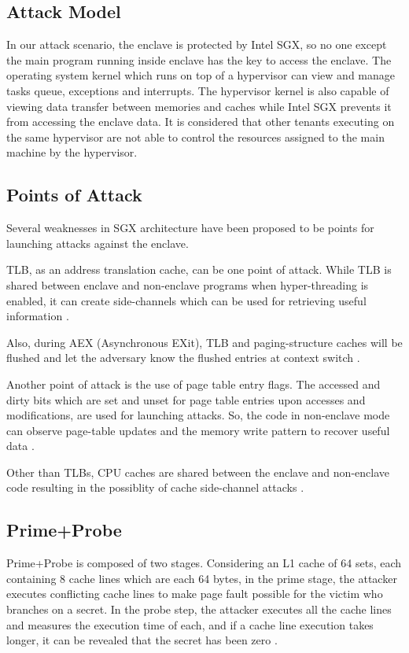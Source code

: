 \subsection{Attack Model}
In our attack scenario, the enclave is protected by Intel SGX, so no one except the main program running inside enclave has the key to access the enclave. The operating system kernel which runs on top of a hypervisor can view and manage tasks queue, exceptions and interrupts. The hypervisor kernel is also capable of viewing data transfer between memories and caches while Intel SGX prevents it from accessing the enclave data. It is considered that other tenants executing on the same hypervisor are not able to control the resources assigned to the main machine by the hypervisor.

\subsection{Points of Attack}
Several weaknesses in SGX architecture have been proposed to be points for launching attacks against the enclave.

TLB, as an address translation cache, can be one point of attack. While TLB is shared between enclave and non-enclave programs when hyper-threading is enabled, it can create side-channels which can be used for retrieving useful information \cite{leakycauldron}.

Also, during AEX (Asynchronous EXit), TLB and paging-structure caches will be flushed and let the adversary know the flushed entries at context switch \cite{leakycauldron}.

Another point of attack is the use of page table entry flags. The accessed and dirty bits which are set and unset for page table entries upon accesses and modifications, are used for launching attacks. So, the code in non-enclave mode can observe page-table updates and the memory write pattern to recover useful data \cite{leakycauldron,stealthy}.

Other than TLBs, CPU caches are shared between the enclave and non-enclave code resulting in the possiblity of cache side-channel attacks \cite{leakycauldron}.

\subsection{Prime+Probe}
Prime+Probe is composed of two stages. Considering an L1 cache of 64 sets, each containing 8 cache lines which are each 64 bytes, in the prime stage, the attacker executes conflicting cache lines to make page fault possible for the victim who branches on a secret. In the probe step, the attacker executes all the cache lines and measures the execution time of each, and if a cache line execution takes longer, it can be revealed that the secret has been zero \cite{primeprobe1,primeprobe2,cloak}.


